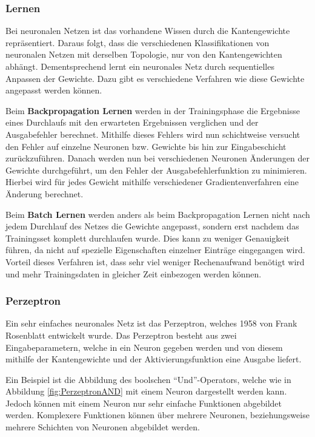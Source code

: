     \subsubsection{Lernen}
    Bei neuronalen Netzen ist das vorhandene Wissen durch die Kantengewichte repräsentiert.
    Daraus folgt, dass die verschiedenen Klassifikationen von neuronalen Netzen mit derselben Topologie, nur von den Kantengewichten abhängt.
    Dementsprechend lernt ein neuronales Netz durch sequentielles Anpassen der Gewichte.
    Dazu gibt es verschiedene Verfahren wie diese Gewichte angepasst werden können.
    \newline

    \noindent
    Beim \textbf{Backpropagation Lernen} werden in der Trainingsphase die Ergebnisse eines Durchlaufs mit den erwarteten Ergebnissen verglichen und der Ausgabefehler berechnet.
    Mithilfe dieses Fehlers wird nun schichtweise versucht den Fehler auf einzelne Neuronen bzw. Gewichte bis hin zur Eingabeschicht zurückzuführen.
    Danach werden nun bei verschiedenen Neuronen Änderungen der Gewichte durchgeführt, um den Fehler der Ausgabefehlerfunktion zu minimieren.
    Hierbei wird für jedes Gewicht mithilfe verschiedener Gradientenverfahren eine Änderung berechnet.
    \newline

    \noindent
    Beim \textbf{Batch Lernen} werden anders als beim Backpropagation Lernen nicht nach jedem Durchlauf des Netzes die Gewichte angepasst, sondern erst nachdem das Trainingsset komplett durchlaufen wurde.
    Dies kann zu weniger Genauigkeit führen, da nicht auf spezielle Eigenschaften einzelner Einträge eingegangen wird.
    Vorteil dieses Verfahren ist, dass sehr viel weniger Rechenaufwand benötigt wird und mehr Trainingsdaten in gleicher Zeit einbezogen werden können.
    
    \subsubsection{Perzeptron}
    Ein sehr einfaches neuronales Netz ist das Perzeptron, welches 1958 von Frank Rosenblatt entwickelt wurde.
    Das Perzeptron besteht aus zwei Eingabeparametern, welche in ein Neuron gegeben werden und von diesem mithilfe der Kantengewichte und der Aktivierungsfunktion eine Ausgabe liefert.

    Ein Beispiel ist die Abbildung des boolschen "`Und"'-Operators, welche wie in Abbildung \ref{fig:PerzeptronAND} mit einem Neuron dargestellt werden kann.
    Jedoch können mit einem Neuron nur sehr einfache Funktionen abgebildet werden. 
    Komplexere Funktionen können über mehrere Neuronen, beziehungsweise mehrere Schichten von Neuronen abgebildet werden.

